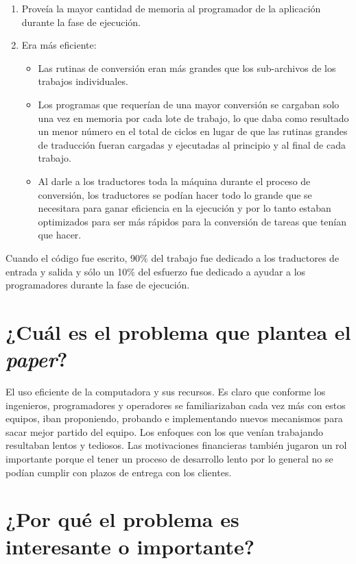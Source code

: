\begin{enumerate}
    \item Proveía la mayor cantidad de memoria al programador de la aplicación durante la fase de ejecución.
    \item Era más eficiente:
    \begin{itemize}
        \item Las rutinas de conversión eran más grandes que los sub-archivos de los trabajos individuales.
        \item Los programas que requerían de una mayor conversión se cargaban solo una vez en memoria por cada lote de trabajo, lo que daba como resultado un menor número en el total de ciclos en lugar de  que las rutinas grandes de traducción fueran cargadas y ejecutadas al principio y al final de cada trabajo.
        \item Al darle a los traductores toda la máquina durante el proceso de conversión, los traductores se podían hacer todo lo grande que se necesitara para ganar eficiencia en la ejecución y por lo tanto estaban optimizados para ser más rápidos para la conversión de tareas que tenían que hacer.
    \end{itemize}
    
\end {enumerate}

Cuando el código fue escrito, 90\% del trabajo fue dedicado a los traductores de entrada y salida y sólo un 10\% del esfuerzo fue dedicado a ayudar a los programadores durante la fase de ejecución.


\section{¿Cuál es el problema que plantea el \textit{paper}?}

El uso eficiente de la computadora y sus recursos. Es claro que conforme los ingenieros, programadores y operadores se familiarizaban cada vez más con estos equipos, iban proponiendo, probando e implementando nuevos mecanismos para sacar mejor partido del equipo. Los enfoques con los que venían trabajando resultaban lentos y tediosos. Las motivaciones financieras también jugaron un rol importante porque el tener un proceso de desarrollo lento por lo general no se podían cumplir con plazos de entrega con los clientes.

\section{¿Por qué el problema es interesante o importante?}

